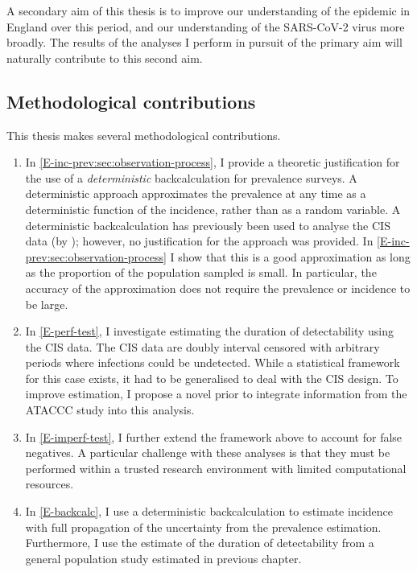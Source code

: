 \documentclass[thesis.tex]{subfiles}
\begin{document}
A secondary aim of this thesis is to improve our understanding of the epidemic in England over this period, and our understanding of the SARS-CoV-2 virus more broadly.
The results of the analyses I perform in pursuit of the primary aim will naturally contribute to this second aim.

\subsection{Methodological contributions}

This thesis makes several methodological contributions.
\begin{enumerate}
    \item In \cref{E-inc-prev:sec:observation-process}, I provide a theoretic justification for the use of a \emph{deterministic} backcalculation for prevalence surveys. A deterministic approach approximates the prevalence at any time as a deterministic function of the incidence, rather than as a random variable.
    A deterministic backcalculation has previously been used to analyse the CIS data (\eg by \textcite{abbottCISincidence}); however, no justification for the approach was provided.
    In \cref{E-inc-prev:sec:observation-process} I show that this is a good approximation as long as the proportion of the population sampled is small.
    In particular, the accuracy of the approximation does not require the prevalence or incidence to be large.
    
    \item In \cref{E-perf-test}, I investigate estimating the duration of detectability using the CIS data.
    The CIS data are doubly interval censored with arbitrary periods where infections could be undetected.
    While a statistical framework for this case exists, it had to be generalised to deal with the CIS design.
    To improve estimation, I propose a novel prior to integrate information from the ATACCC study into this analysis.
    
    \item In \cref{E-imperf-test}, I further extend the framework above to account for false negatives.
    A particular challenge with these analyses is that they must be performed within a trusted research environment with limited computational resources.

    \item In \cref{E-backcalc}, I use a deterministic backcalculation to estimate incidence with full propagation of the uncertainty from the prevalence estimation.
    Furthermore, I use the estimate of the duration of detectability from a general population study estimated in previous chapter.
    

\end{enumerate}
\end{document}
